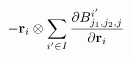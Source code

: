 \documentclass[24pt]{article}
\begin{document}
\begin{eqnarray*}
- {\bf r}_i \otimes \sum_{i' \in I} \frac{\partial {B^{i'}_{j_1,j_2,j}}}{\partial {\bf r}_i}
\end{eqnarray*}
\end{document}
